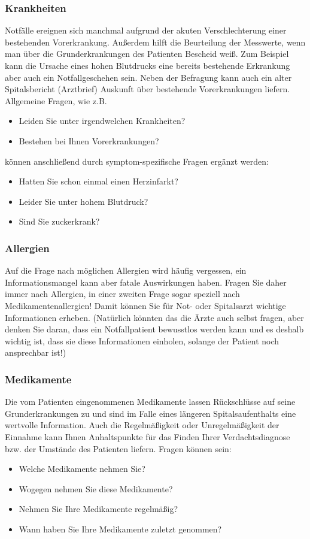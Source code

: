 \subsubsection{Krankheiten}
Notfälle ereignen sich manchmal aufgrund der akuten Verschlechterung einer bestehenden Vorerkrankung. Außerdem hilft die Beurteilung der Messwerte, wenn man über die Grunderkrankungen des Patienten Bescheid weiß. Zum Beispiel kann die Ursache eines hohen Blutdrucks eine bereits bestehende Erkrankung aber auch ein Notfallgeschehen sein. Neben der Befragung kann auch ein alter Spitalsbericht (Arztbrief) Auskunft über bestehende Vorerkrankungen liefern. Allgemeine Fragen, wie z.B.
\begin{itemize}
\item Leiden Sie unter irgendwelchen Krankheiten?
\item Bestehen bei Ihnen Vorerkrankungen?
\end{itemize}
können anschließend durch symptom-spezifische Fragen ergänzt werden:
\begin{itemize}
\item Hatten Sie schon einmal einen Herzinfarkt?
\item Leider Sie unter hohem Blutdruck?
\item Sind Sie zuckerkrank?
\end{itemize}

\subsubsection{Allergien}
Auf die Frage nach möglichen Allergien wird häufig vergessen, ein Informationsmangel kann aber fatale Auswirkungen haben. Fragen Sie daher immer nach Allergien, in einer zweiten Frage sogar speziell nach Medikamentenallergien! Damit können Sie für Not- oder Spitalsarzt wichtige Informationen erheben. (Natürlich könnten das die Ärzte auch selbst fragen, aber denken Sie daran, dass ein Notfallpatient bewusstlos werden kann und es deshalb wichtig ist, dass sie diese Informationen einholen, solange der Patient noch ansprechbar ist!)

\subsubsection{Medikamente}
Die vom Patienten eingenommenen Medikamente lassen Rückschlüsse auf seine Grunderkrankungen zu und sind im Falle eines längeren Spitalsaufenthalts eine wertvolle Information. Auch die Regelmäßigkeit oder Unregelmäßigkeit der Einnahme kann Ihnen Anhaltspunkte für das Finden Ihrer Verdachtsdiagnose bzw. der Umstände des Patienten liefern. Fragen können sein:
\begin{itemize}
\item Welche Medikamente nehmen Sie?
\item Wogegen nehmen Sie diese Medikamente?
\item Nehmen Sie Ihre Medikamente regelmäßig?
\item Wann haben Sie Ihre Medikamente zuletzt genommen?
\end{itemize}

